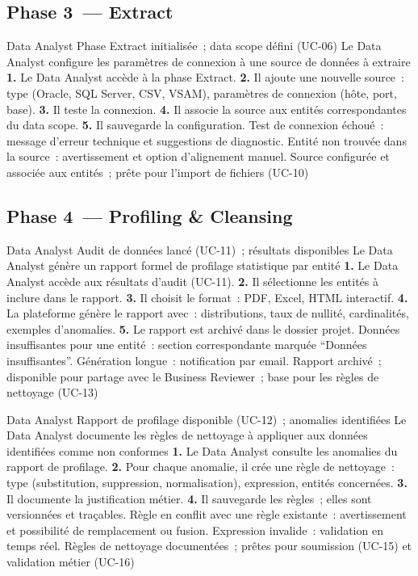 \subsection*{Phase 3~--- Extract}

  {Data Analyst}
  {Phase Extract initialisée~; data scope défini (UC-06)}
  {Le Data Analyst configure les paramètres de connexion à une source de données à extraire}
  {\textbf{1.} Le Data Analyst accède à la phase Extract. \textbf{2.} Il ajoute une nouvelle source~: type (Oracle, SQL Server, CSV, VSAM), paramètres de connexion (hôte, port, base). \textbf{3.} Il teste la connexion. \textbf{4.} Il associe la source aux entités correspondantes du data scope. \textbf{5.} Il sauvegarde la configuration.}
  {Test de connexion échoué~: message d'erreur technique et suggestions de diagnostic. Entité non trouvée dans la source~: avertissement et option d'alignement manuel.}
  {Source configurée et associée aux entités~; prête pour l'import de fichiers (UC-10)}

\subsection*{Phase 4~--- Profiling \& Cleansing}

  {Data Analyst}
  {Audit de données lancé (UC-11)~; résultats disponibles}
  {Le Data Analyst génère un rapport formel de profilage statistique par entité}
  {\textbf{1.} Le Data Analyst accède aux résultats d'audit (UC-11). \textbf{2.} Il sélectionne les entités à inclure dans le rapport. \textbf{3.} Il choisit le format~: PDF, Excel, HTML interactif. \textbf{4.} La plateforme génère le rapport avec~: distributions, taux de nullité, cardinalités, exemples d'anomalies. \textbf{5.} Le rapport est archivé dans le dossier projet.}
  {Données insuffisantes pour une entité~: section correspondante marquée ``Données insuffisantes''. Génération longue~: notification par email.}
  {Rapport archivé~; disponible pour partage avec le Business Reviewer~; base pour les règles de nettoyage (UC-13)}

  {Data Analyst}
  {Rapport de profilage disponible (UC-12)~; anomalies identifiées}
  {Le Data Analyst documente les règles de nettoyage à appliquer aux données identifiées comme non conformes}
  {\textbf{1.} Le Data Analyst consulte les anomalies du rapport de profilage. \textbf{2.} Pour chaque anomalie, il crée une règle de nettoyage~: type (substitution, suppression, normalisation), expression, entités concernées. \textbf{3.} Il documente la justification métier. \textbf{4.} Il sauvegarde les règles~; elles sont versionnées et traçables.}
  {Règle en conflit avec une règle existante~: avertissement et possibilité de remplacement ou fusion. Expression invalide~: validation en temps réel.}
  {Règles de nettoyage documentées~; prêtes pour soumission (UC-15) et validation métier (UC-16)}

